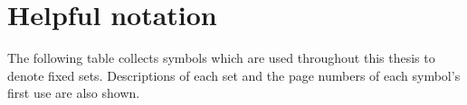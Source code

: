 \clearpage

\section*{\hypertarget{notation}{Helpful notation}}
\renewcommand\thesubsection{\thesection\Alph{subsection}}

\pagestyle{fancy}
\fancyhf{}
\renewcommand{\headrulewidth}{0pt}
\cfoot{\thepage}

The following table collects symbols which are used throughout this thesis to denote fixed sets. Descriptions of each set and the page numbers of each symbol's first use are also shown.

\vspace*{6mm}

